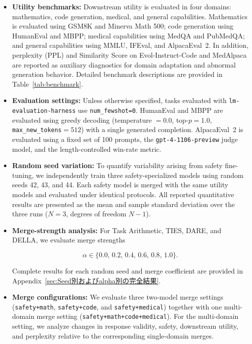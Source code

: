 \begin{itemize}
\begin{itemize}
\item \textbf{Utility benchmarks:}
Downstream utility is evaluated in four domains: mathematics, code generation, medical, and general capabilities. Mathematics is evaluated using GSM8K and Minerva Math 500; code generation using HumanEval and MBPP; medical capabilities using MedQA and PubMedQA; and general capabilities using MMLU, IFEval, and AlpacaEval~2. In addition, perplexity (PPL) and Similarity Score on Evol-Instruct-Code and MedAlpaca are reported as auxiliary diagnostics for domain adaptation and abnormal generation behavior. Detailed benchmark descriptions are provided in Table~\ref{tab:benchmark}.





\item \textbf{Evaluation settings:}
Unless otherwise specified, tasks evaluated with \texttt{lm-evaluation-harness} use \texttt{num\_fewshot=0}. HumanEval and MBPP are evaluated using greedy decoding (temperature $=0.0$, top-$p=1.0$, \texttt{max\_new\_tokens}$=512$) with a single generated completion. AlpacaEval~2 is evaluated using a fixed set of 100 prompts, the \texttt{gpt-4-1106-preview} judge model, and the length-controlled win-rate metric.

\item \textbf{Random seed variation:}
To quantify variability arising from safety fine-tuning, we independently train three safety-specialized models using random seeds 42, 43, and 44. Each safety model is merged with the same utility models and evaluated under identical protocols. All reported quantitative results are presented as the mean and sample standard deviation over the three runs ($N=3$, degrees of freedom $N-1$).

\item \textbf{Merge-strength analysis:}
For Task Arithmetic, TIES, DARE, and DELLA, we evaluate merge strengths

\[
\alpha \in \{0.0,\,0.2,\,0.4,\,0.6,\,0.8,\,1.0\}.
\]

Complete results for each random seed and merge coefficient are provided in Appendix~\ref{sec:Seed別およびalpha別の完全結果}.

\item \textbf{Merge configurations:}
We evaluate three two-model merge settings (\texttt{safety+math}, \texttt{safety+code}, and \texttt{safety+medical}) together with one multi-domain merge setting (\texttt{safety+math+code+medical}). For the multi-domain setting, we analyze changes in response validity, safety, downstream utility, and perplexity relative to the corresponding single-domain merges.


\end{itemize}
\end{itemize}
